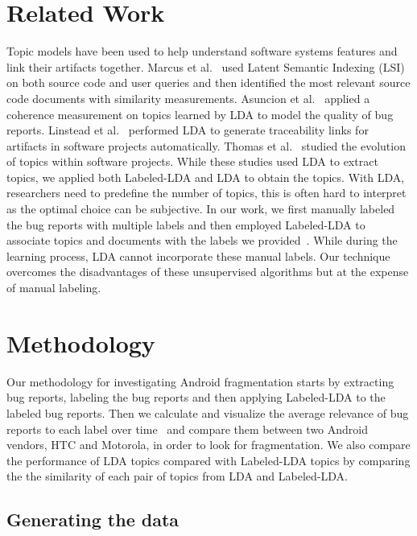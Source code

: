 \documentclass[10pt, conference, compsocconf]{IEEEtran}
\begin{document}
\section{Related Work}
\label{sec:relatedwork}
Topic models have been used to help understand software systems
features and link their artifacts together.
Marcus et al.~\cite{Marcus04aninformation} used Latent Semantic
Indexing (LSI) on both source code and user queries and then
identified the most relevant source code documents with similarity
measurements. 
Asuncion et al.~\cite{Asuncion:2010} applied a coherence measurement
on topics learned by LDA to model the quality of bug reports. 
Linstead et al.~\cite{Linstead:2009} performed LDA to generate
traceability links for artifacts in software projects automatically. 
Thomas et al.~\cite{Thomas:2011} studied
the evolution of topics within software projects.
While these studies used 
 LDA to extract topics,  we applied both Labeled-LDA and LDA to
obtain the topics. 
With LDA, researchers need to predefine the number of topics, this is
often hard to interpret as the optimal choice can be subjective.
In our work, we first manually labeled the bug reports with multiple
labels and then employed
Labeled-LDA to associate topics and documents with the labels we
provided~\cite{labeledlda}. 
While during the learning process, LDA cannot incorporate these manual
labels. 
Our technique
overcomes the disadvantages of these
unsupervised algorithms but at the expense of manual labeling.


\section{Methodology}
\label{sec:methodology}

Our methodology for investigating Android fragmentation starts by extracting
bug reports, labeling the bug reports and then applying
Labeled-LDA to the labeled bug reports.
Then 
 we calculate and visualize the average relevance of bug reports to each label
over time~\cite{Hindle} and compare them between two Android vendors,
HTC and Motorola, in order to look for fragmentation.
We also compare the performance of LDA topics compared with
Labeled-LDA topics by comparing the 
the similarity of each pair of
topics from LDA and Labeled-LDA.

\subsection{Generating the data}
\end{document}
